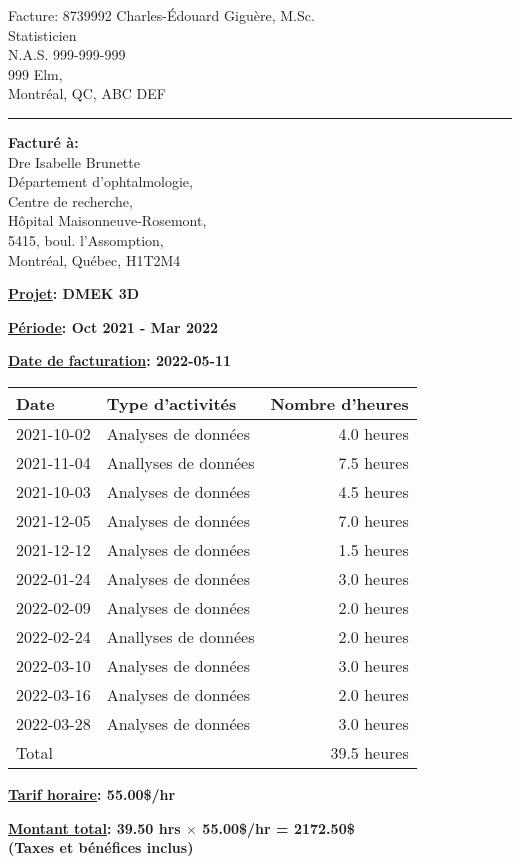 \documentclass{facture} %
\def \tab {\hspace*{3ex}} %
\begin{document}
Facture: 8739992 \hfill Charles-Édouard Giguère, M.Sc. \\
\null \hfill Statisticien \\
\null \hfill N.A.S. 999-999-999 \\
\null \hfill 999 Elm,\\
\null \hfill Montréal, QC, ABC DEF \\
\hrule height 2 pt \relax %

\bigskip
\bigskip

\textbf{ Facturé à:} \\
\tab Dre Isabelle Brunette \\
\tab Département d'ophtalmologie, \\
\tab Centre de recherche, \\
\tab Hôpital Maisonneuve-Rosemont, \\
\tab 5415, boul. l'Assomption, \\
\tab Montréal, Québec, H1T2M4 \\

\bigskip
\bigskip

\textbf{\underline{Projet}: DMEK 3D}

\bigskip
    
\textbf{\underline{Période}: Oct 2021 - Mar 2022} 

\bigskip

\textbf{\underline{Date de facturation}: 2022-05-11} 

\bigskip
\bigskip
\bigskip


\begin{center}
  \begin{tabular}[htp!]{l l r}
    \hline
    \textbf{Date} & \textbf{Type d'activités} & \textbf{Nombre d'heures} \\
    \hline \hline
    2021-10-02 & Analyses de données & 4.0 heures\\
2021-11-04 & Anallyses de données & 7.5 heures\\
2021-10-03 & Analyses de données & 4.5 heures\\
2021-12-05 & Analyses de données & 7.0 heures\\
2021-12-12 & Analyses de données & 1.5 heures\\
2022-01-24 & Analyses de données & 3.0 heures\\
2022-02-09 & Analyses de données & 2.0 heures\\
2022-02-24 & Anallyses de données & 2.0 heures\\
2022-03-10 & Analyses de données & 3.0 heures\\
2022-03-16 & Analyses de données & 2.0 heures\\
2022-03-28 & Analyses de données & 3.0 heures\\
\hline
Total   & & 39.5 heures \\
\hline
    
  \end{tabular}
\end{center}

\bigskip

\textbf{\underline{Tarif horaire}: 55.00\$/hr}

\bigskip

\textbf{\underline{Montant total}: 39.50 hrs  $\times$ 55.00\$/hr
  = 2172.50\$} \\
\textbf{(Taxes et bénéfices inclus)}
\end{document}
